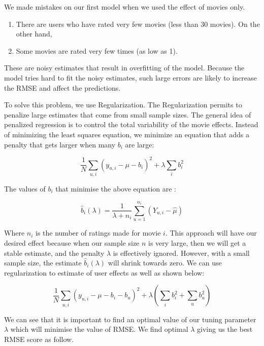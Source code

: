 \documentclass[]{article}
\begin{document}
We made mistakes on our first model when we used the effect of movies
only.

\begin{enumerate}
\item There are users who have rated very few movies (less than 30 movies). On the other hand, 
\item Some movies are rated very few times (as low as 1). 
\end{enumerate}

These are noisy estimates that result in overfitting of the model.
Because the model tries hard to fit the noisy estimates, such large
errors are likely to increase the RMSE and affect the predictions.

To solve this problem, we use Regularization. The Regularization permits
to penalize large estimates that come from small sample sizes. The
general idea of penalized regression is to control the total variability
of the movie effects. Instead of minimizing the least squares equation,
we minimize an equation that adds a penalty that gets larger when many
\(b_{i}\) are large:

\begin{equation}
\frac{1}{N} \sum_{u,i} \left(y_{u,i} - \mu - b_i\right)^2 + \lambda \sum_{i} b_i^2
\end{equation}

The values of \(b_{i}\) that minimise the above equation are :

\begin{equation}
\hat{b}_i(\lambda) = \frac{1}{\lambda + n_i} \sum_{u=1}^{n_i} \left(Y_{u,i} - \hat{\mu}\right)
\end{equation}

Where \(n_{i}\) is the number of ratings made for movie \(i\). This
approach will have our desired effect because when our sample size \(n\)
is very large, then we will get a stable estimate, and the penalty
\(\lambda\) is effectively ignored. However, with a small sample size,
the estimate \(\hat{b}_i(\lambda)\) will shrink towards zero. We can use
regularization to estimate of user effects as well as shown below:

\begin{equation}
\frac{1}{N} \sum_{u,i} \left(y_{u,i} - \mu - b_i - b_u \right)^2 + 
\lambda \left(\sum_{i} b_i^2 + \sum_{u} b_u^2\right)
\end{equation}

We can see that it is important to find an optimal value of our tuning
parameter \(\lambda\) which will minimise the value of RMSE. We find
optimal \(\lambda\) giving us the best RMSE score as follow.
\end{document}
